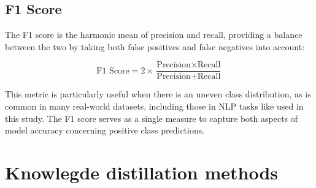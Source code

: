 \subsection{F1 Score}
The F1 score is the harmonic mean of precision and recall, providing a balance between the two by taking both false positives and false negatives into account:

$$
    \text{F1 Score} = 2 \times \frac{\text{Precision} \times \text{Recall}}{\text{Precision} + \text{Recall}}
$$

This metric is particularly useful when there is an uneven class distribution, as is common in many real-world datasets, including those in NLP tasks like used in this study. The F1 score serves as a single measure to capture both aspects of model accuracy concerning positive class predictions.


\section{Knowlegde distillation methods}